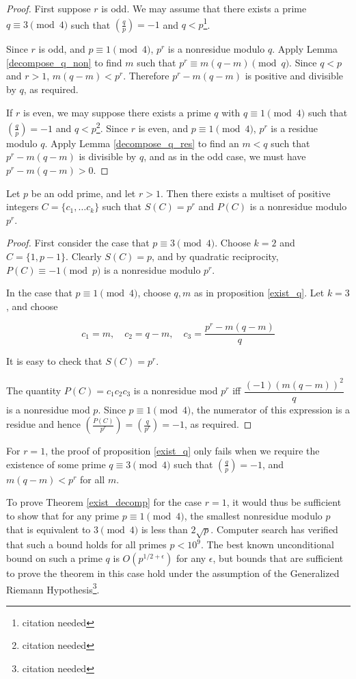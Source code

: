 \documentclass{article}
\begin{document}
\begin{proof}
  First suppose $r$ is odd. We may assume that there exists a prime
  $q \equiv 3 \pmod 4$ such that $\left( \frac{q}{p} \right) = -1$
  and $q < p$\footnote{citation needed}. 

  Since $r$ is odd, and $p \equiv 1 \pmod 4$, $p^r$ is a nonresidue
  modulo $q$. Apply Lemma \ref{decompose_q_non} to find $m$ such
  that $p^r \equiv m(q-m) \pmod q$. Since $q < p$ and $r > 1$,
  $m(q-m) < p^r$. Therefore $p^r - m(q-m)$ is positive and divisible
  by $q$, as required.

  If $r$ is even, we may suppose there exists a prime $q$ with $q
  \equiv 1 \pmod 4$ such that $\left( \frac{q}{p} \right) = -1$ and $q
  < p$\footnote{citation needed}. Since $r$ is even, and $p \equiv 1
  \pmod 4$, $p^r$ is a residue modulo $q$. Apply Lemma
  \ref{decompose_q_res} to find an $m < q$ such that $p^r - m(q-m)$ is
  divisible by $q$, and as in the odd case, we must have $p^r - m(q-m)
  > 0$.
\end{proof}
\begin{thm}
  \label{exist_decomp}
  Let $p$ be an odd prime, and let $r > 1$. Then there exists a
  multiset of positive integers $C = \{c_1, \ldots c_k\}$ such that
  $S(C) = p^r$ and $P(C)$ is a nonresidue modulo $p^r$.
\end{thm}
\begin{proof}
  First consider the case that $p \equiv 3 \pmod 4$. Choose $k = 2$
  and $C = \{1, p-1\}$. Clearly $S(C) = p$, and by quadratic
  reciprocity, $P(C) \equiv -1 \pmod p$ is a nonresidue modulo $p^r$.

  In the case that $p \equiv 1 \pmod 4$, choose $q,m$ as in
  proposition \ref{exist_q}. Let $k=3$, and choose 

  \[c_1 = m, \quad c_2 =  q-m, \quad c_3 = \frac{p^r - m(q-m)}{q}\]

  It is easy to check that $S(C) = p^r$.

  The quantity $P(C) = c_1c_2c_3$ is a nonresidue mod $p^r$ iff
  $\dfrac{(-1)(m(q-m))^2}{q}$ is a nonresidue mod $p$. Since $p \equiv
  1 \pmod 4$, the numerator of this expression is a residue and hence
  $\left( \frac{P(C)}{p^r} \right) = \left( \frac{q}{p^r} \right) =
  -1$, as required.
\end{proof}

\begin{remark} For $r=1$, the proof of proposition \ref{exist_q} only
  fails when we require the existence of some prime $q \equiv 3 \pmod
  4$ such that $\left( \frac{q}{p} \right) = -1$, and $m(q-m) < p^r$
  for all $m$.

  To prove Theorem \ref{exist_decomp} for the case $r=1$, it would
  thus be sufficient to show that for any prime $p \equiv 1 \pmod 4$,
  the smallest nonresidue modulo $p$ that is equivalent to $3 \pmod 4$
  is less than $2\sqrt{p}$. Computer search has verified that such a
  bound holds for all primes $p < 10^9$. The best known unconditional
  bound on such a prime $q$ is $O(p^{1/2 + \epsilon})$ for any
  $\epsilon$, but bounds that are sufficient to prove the theorem in
  this case hold under the assumption of the Generalized Riemann
  Hypothesis\footnote{citation needed}.
\end{remark}
\end{document}

